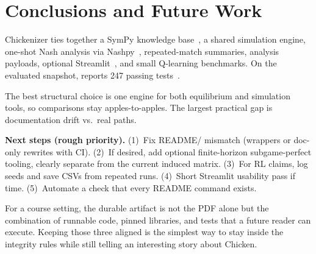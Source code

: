 \section{Conclusions and Future Work}

Chickenizer ties together a SymPy knowledge base~\cite{sympy}, a shared simulation engine, one-shot Nash analysis via Nashpy~\cite{nashpy,nash1950}, repeated-match summaries, analysis payloads, optional Streamlit~\cite{streamlit}, and small Q-learning benchmarks. On the evaluated snapshot,  reports 247 passing tests~\cite{pytest}.

The best structural choice is one engine for both equilibrium and simulation tools, so comparisons stay apples-to-apples. The largest practical gap is documentation drift vs.\ real paths.

\textbf{Next steps (rough priority).} (1)~Fix README/ mismatch (wrappers or doc-only rewrites with CI). (2)~If desired, add optional finite-horizon subgame-perfect tooling, clearly separate from the current induced matrix. (3)~For RL claims, log seeds and save CSVs from repeated runs. (4)~Short Streamlit usability pass if time. (5)~Automate a check that every README command exists.

For a course setting, the durable artifact is not the PDF alone but the combination of runnable code, pinned libraries, and tests that a future reader can execute. Keeping those three aligned is the simplest way to stay inside the integrity rules while still telling an interesting story about Chicken.
